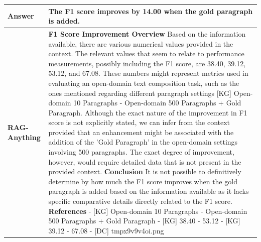 \documentclass{article}
\begin{document}
\begin{table}[t]
{\begin{tabular}{|l|p{15cm}|}
    \hline
    \textbf{Answer} & The F1 score improves by 14.00 when the gold paragraph is added.\\
    \hline
    \textbf{RAG-Anything} & 
    \textbf{F1 Score Improvement Overview}\newline
    Based on the information available, there are various numerical values provided in the context. The relevant values that seem to relate to performance measurements, possibly including the F1 score, are 38.40, 39.12, 53.12, and 67.08. These numbers might represent metrics used in evaluating an open-domain text composition task, such as the ones mentioned regarding different paragraph settings [KG] Open-domain 10 Paragraphs - Open-domain 500 Paragraphs + Gold Paragraph.\newline
    Although the exact nature of the improvement in F1 score is not explicitly stated, we can infer from the context provided that an enhancement might be associated with the addition of the 'Gold Paragraph' in the open-domain settings involving 500 paragraphs. The exact degree of improvement, however, would require detailed data that is not present in the provided context.\newline
    \textbf{Conclusion}\newline
    It is not possible to definitively determine by how much the F1 score improves when the gold paragraph is added based on the information available as it lacks specific comparative details directly related to the F1 score.\newline
    \textbf{References}\newline
    - [KG] Open-domain 10 Paragraphs - Open-domain 500 Paragraphs + Gold Paragraph\newline
    - [KG] 38.40 - 53.12\newline
    - [KG] 39.12 - 67.08\newline
    - [DC] tmpx9v9v4oi.png \\ \hline
    \end{tabular}
    }
    \vspace{-0.2in}
  \end{table}




\end{document}
